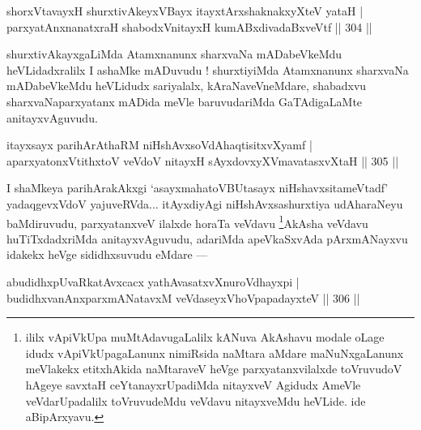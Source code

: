 \begin{shl}
shorxVtavayxH shurxtivAkeyxVBayx itayxtArx\s \s shaknakxyXteV yataH |
parxyatAnxnanatxraH shabodxV\s nitayxH kumABxdivadaBxveVtf \hfill || 304 ||
\end{shl}

\begin{artha}
shurxtivAkayxgaLiMda Atamxnanunx sharxvaNa mADabeVkeMdu heVLidadxralilx I ashaMke mADuvudu ! shurxtiyiMda Atamxnanunx sharxvaNa mADabeVkeMdu heVLidudx sariyalalx, kAraNaveVneMdare, shabadxvu sharxvaNaparxyatanx mADida meVle baruvudariMda GaTAdigaLaMte anitayxvAguvudu.
\end{artha}

\begin{shl}
itayxsayx parihArAthaRM niHshAvxsoVdAhaqtisitxvXyamf |
aparxyatonxVtithxtoV veVdoV nitayxH sAyxdovxyXVmavatasxvXtaH \hfill || 305 ||
\end{shl}

\begin{artha}
I shaMkeya parihArakAkxgi `asayxmahatoVBUtasayx niHshavxsitameVtadf' \-yadaqgevxVdoV yajuveRVda... itAyxdiyAgi niHshAvxsashurxtiya udAharaNeyu baMdiruvudu, parxyatanxveV ilalxde horaTa veVdavu \footnote[2]{ililx vApiVkUpa muMtAdavugaLalilx kANuva AkAshavu modale oLage idudx vApiVkUpagaLanunx nimiRsida naMtara aMdare maNuNxgaLanunx meVlakekx etitxhAkida naMtaraveV heVge parxyatanxvilalxde toVruvudoV hAgeye savxtaH ceYtanayxrUpadiMda nitayxveV Agidudx AmeVle veVdarUpadalilx toVruvudeMdu veVdavu nitayxveMdu heVLide. ide aBipArxyavu.}AkAsha veVdavu huTiTxdadxriMda anitayxvAguvudu, adariMda apeVkaSxvAda pArxmANayxvu idakekx heVge sididhxsuvudu  eMdare  {\rm ---} 
\end{artha}

\begin{shl}
abudidhxpUvaRkatAvxcacx yathAvasatxvXnuroVdhayxpi |
budidhxvanAnxparxmANatavxM veVdaseyxVhoVpapadayxteV \hfill || 306 ||
\end{shl}

